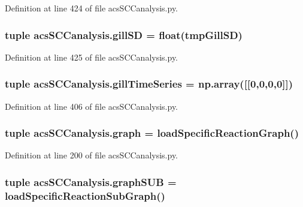 Definition at line 424 of file acs\-S\-C\-Canalysis.\-py.

\hypertarget{a00097_acdb3e72aea08c29494799fd08763b406}{
\subsubsection[{gill\-S\-D}]{\setlength{\rightskip}{0pt plus 5cm}tuple acs\-S\-C\-Canalysis.\-gill\-S\-D = float(tmp\-Gill\-S\-D)}}\label{a00097_acdb3e72aea08c29494799fd08763b406}


Definition at line 425 of file acs\-S\-C\-Canalysis.\-py.

\hypertarget{a00097_a99669fe823cebc560b46c3746f9183e7}{
\subsubsection[{gill\-Time\-Series}]{\setlength{\rightskip}{0pt plus 5cm}tuple acs\-S\-C\-Canalysis.\-gill\-Time\-Series = np.\-array(\mbox{[}\mbox{[}0,0,0,0\mbox{]}\mbox{]})}}\label{a00097_a99669fe823cebc560b46c3746f9183e7}


Definition at line 406 of file acs\-S\-C\-Canalysis.\-py.

\hypertarget{a00097_ab45392da38059bf7557c22cbc73e5580}{
\subsubsection[{graph}]{\setlength{\rightskip}{0pt plus 5cm}tuple acs\-S\-C\-Canalysis.\-graph = {\bf load\-Specific\-Reaction\-Graph}()}}\label{a00097_ab45392da38059bf7557c22cbc73e5580}


Definition at line 200 of file acs\-S\-C\-Canalysis.\-py.

\hypertarget{a00097_ae307841da4a073fad4f6eaa172b0b970}{
\subsubsection[{graph\-S\-U\-B}]{\setlength{\rightskip}{0pt plus 5cm}tuple acs\-S\-C\-Canalysis.\-graph\-S\-U\-B = {\bf load\-Specific\-Reaction\-Sub\-Graph}()}}\label{a00097_ae307841da4a073fad4f6eaa172b0b970}


